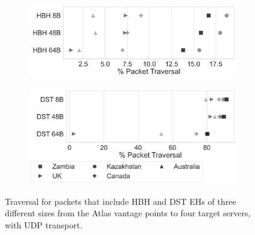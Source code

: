 \documentclass[conference]{IEEEtran}
\begin{document}
\begin{figure}[htbp]
    \centering
    
    \begin{subfigure}[b]{0.45\textwidth}
        \includegraphics[width=\textwidth]{hbh-size-comparison.png}
        \label{subfig:a}
    \end{subfigure}
    \hfill
    \begin{subfigure}[b]{0.45\textwidth}
        \includegraphics[width=\textwidth]{dst-size-comparison.png}
        \label{subfig:b}
    \end{subfigure}
    
    \caption{Traversal for packets that include HBH and DST EHs of three different sizes from the Atlas vantage points to four target servers, with UDP transport.}
    \label{fig:main-size}
\end{figure}
\end{document}
